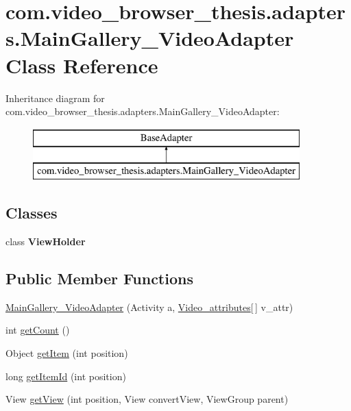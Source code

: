 \hypertarget{classcom_1_1video__browser__thesis_1_1adapters_1_1_main_gallery___video_adapter}{\section{com.\-video\-\_\-browser\-\_\-thesis.\-adapters.\-Main\-Gallery\-\_\-\-Video\-Adapter Class Reference}
\label{classcom_1_1video__browser__thesis_1_1adapters_1_1_main_gallery___video_adapter}
}
Inheritance diagram for com.\-video\-\_\-browser\-\_\-thesis.\-adapters.\-Main\-Gallery\-\_\-\-Video\-Adapter\-:\begin{figure}[H]
\begin{center}
\leavevmode
\includegraphics[height=2.000000cm]{classcom_1_1video__browser__thesis_1_1adapters_1_1_main_gallery___video_adapter}
\end{center}
\end{figure}
\subsection*{Classes}
\begin{DoxyCompactItemize}
\item 
class {\bfseries View\-Holder}
\end{DoxyCompactItemize}
\subsection*{Public Member Functions}
\begin{DoxyCompactItemize}
\item 
\hyperlink{classcom_1_1video__browser__thesis_1_1adapters_1_1_main_gallery___video_adapter_a91b47bfbe580412cc75d9cc1d3b6206a}{Main\-Gallery\-\_\-\-Video\-Adapter} (Activity a, \hyperlink{classcom_1_1video__browser__thesis_1_1elements_1_1_video__attributes}{Video\-\_\-attributes}\mbox{[}$\,$\mbox{]} v\-\_\-attr)
\item 
int \hyperlink{classcom_1_1video__browser__thesis_1_1adapters_1_1_main_gallery___video_adapter_a4ffe30aba7cb71f708d8e08936a51472}{get\-Count} ()
\item 
Object \hyperlink{classcom_1_1video__browser__thesis_1_1adapters_1_1_main_gallery___video_adapter_acbffb17f23caa716a159ce244de897dd}{get\-Item} (int position)
\item 
long \hyperlink{classcom_1_1video__browser__thesis_1_1adapters_1_1_main_gallery___video_adapter_af207f51545e3ffdd70db09a23d3ca51a}{get\-Item\-Id} (int position)
\item 
View \hyperlink{classcom_1_1video__browser__thesis_1_1adapters_1_1_main_gallery___video_adapter_af019b3e184f51c74d1409d6d0e2e1806}{get\-View} (int position, View convert\-View, View\-Group parent)
\end{DoxyCompactItemize}


